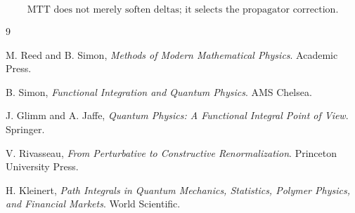 \documentclass[11pt]{article}
\begin{document}
\[
        \boxed{
        \text{MTT does not merely soften deltas; it selects the propagator correction.}
        }
\]

\begin{thebibliography}{9}

M. Reed and B. Simon,
\emph{Methods of Modern Mathematical Physics}.
Academic Press.

B. Simon,
\emph{Functional Integration and Quantum Physics}.
AMS Chelsea.

J. Glimm and A. Jaffe,
\emph{Quantum Physics: A Functional Integral Point of View}.
Springer.

V. Rivasseau,
\emph{From Perturbative to Constructive Renormalization}.
Princeton University Press.

H. Kleinert,
\emph{Path Integrals in Quantum Mechanics, Statistics, Polymer Physics, and Financial Markets}.
World Scientific.

\end{thebibliography}
\end{document}
